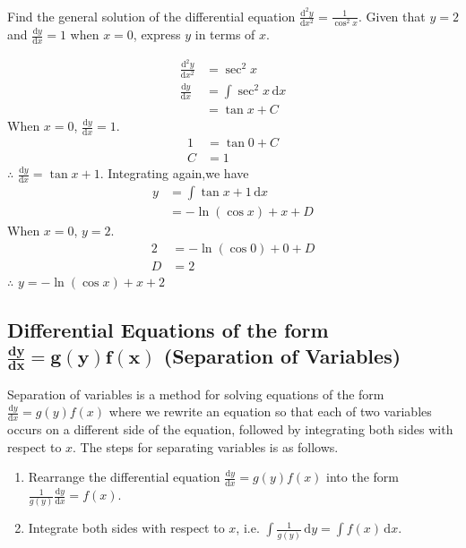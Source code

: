 \documentclass[11pt,a4paper]{book}
\begin{document}
\begin{example}

Find the general solution of the differential equation ${\displaystyle \frac{\mathrm{d}^{2}y}{\mathrm{d}x^{2}}=\frac{1}{\cos^{2}x}}$.
Given that $y=2$ and ${\displaystyle \frac{\mathrm{d}y}{\mathrm{d}x}=1}$ when $x=0$,
express $y$ in terms of $x$.

\Solution

\begin{align*}
\frac{\mathrm{d}^{2}y}{\mathrm{d}x^{2}} & =\sec^{2}x\\
\frac{\mathrm{d}y}{\mathrm{d}x} & =\int\sec^{2}x\, \mathrm{d}x\\
 & =\tan x+C
\end{align*}
When $x=0$, ${\displaystyle \frac{\mathrm{d}y}{\mathrm{d}x}=1}$.
\begin{align*}
1 & =\tan0+C\\
C & =1
\end{align*}
$\therefore$ ${\displaystyle \frac{\mathrm{d}y}{\mathrm{d}x}=\tan x+1}$. Integrating
again,we have
\begin{align*}
y & =\int\tan x+1\, \mathrm{d}x\\
 & =-\ln\left(\cos x\right)+x+D
\end{align*}
When $x=0$, $y=2$.
\begin{align*}
2 & =-\ln\left(\cos0\right)+0+D\\
D & =2
\end{align*}
$\therefore$ $y=-\ln\left(\cos x\right)+x+2$

\end{example}

\newpage

\subsection{Differential Equations of the form $\boldsymbol{\frac{\textbf{d}y}{\textbf{d}x}=g\left(y\right)f\left(x\right)}$ (Separation of Variables)}

Separation of variables is a method for solving equations of the form
${\displaystyle \frac{\mathrm{d}y}{\mathrm{d}x}=g\left(y\right)f\left(x\right)}$ where
we rewrite an equation so that each of two variables occurs on a different
side of the equation, followed by integrating both sides with respect
to $x$. The steps for separating variables is as follows.

\begin{tcolorbox}[colback=blue!5, colframe=black,boxrule=.4pt, sharpish corners]

\begin{enumerate}
\item Rearrange the differential equation ${\displaystyle \frac{\mathrm{d}y}{\mathrm{d}x}=g\left(y\right)f\left(x\right)}$
into the form ${\displaystyle \frac{1}{g\left(y\right)}\frac{\mathrm{d}y}{\mathrm{d}x}=f\left(x\right)}$.
\item Integrate both sides with respect to $x$, i.e. ${\displaystyle \int}{\displaystyle \frac{1}{g\left(y\right)}\,\mathrm{d}y=\int f\left(x\right)\,\mathrm{d}x}$.
\end{enumerate}
\end{tcolorbox}
\end{document}
